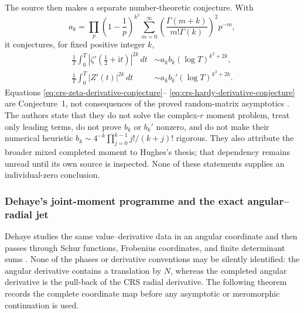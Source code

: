 The source then makes a separate number-theoretic conjecture.  With
\begin{equation}
 a_k=\prod_p\left(1-\frac1p\right)^{k^2}
 \sum_{m=0}^{\infty}
 \left(\frac{\Gamma(m+k)}{m!\Gamma(k)}\right)^2p^{-m},
 \label{eq:crs-arithmetic-factor}
\end{equation}
it conjectures, for fixed positive integer $k$,
\begin{align}
 \frac1T\int_0^T
 \left|\zeta'\!\left(\frac12+\mathrm it\right)\right|^{2k}\,dt
 &\sim a_kb_k(\log T)^{k^2+2k},
 \label{eq:crs-zeta-derivative-conjecture}\\
 \frac1T\int_0^T|Z'(t)|^{2k}\,dt
 &\sim a_kb_k'(\log T)^{k^2+2k}.
 \label{eq:crs-hardy-derivative-conjecture}
\end{align}
Equations \eqref{eq:crs-zeta-derivative-conjecture}--
\eqref{eq:crs-hardy-derivative-conjecture} are Conjecture~1, not consequences
of the proved random-matrix asymptotics
\cite[Conj.~1 and Remarks~1--7]{conreyRubinsteinSnaith2006}.  The authors state
that they do not solve the complex-$r$ moment problem, treat only leading terms,
do not prove $b_k$ or $b_k'$ nonzero, and do not make their numerical heuristic
$b_k\sim4^{-k}\prod_{j=0}^{k-1}j!/(k+j)!$ rigorous.  They also attribute the
broader mixed completed moment to Hughes's thesis; that dependency remains unread
until its own source is inspected.  None of these statements supplies an
individual-zero conclusion.

\subsubsection{Dehaye's joint-moment programme and the exact angular--radial jet}

Dehaye studies the same value--derivative data in an angular coordinate and then
passes through Schur functions, Frobenius coordinates, and finite determinant sums
\cite{dehaye2008}.  None of the phases or derivative conventions may be silently
identified: the angular derivative contains a translation by $N$, whereas the
completed angular derivative is the pull-back of the CRS radial derivative.  The
following theorem records the complete coordinate map before any asymptotic or
meromorphic continuation is used.

